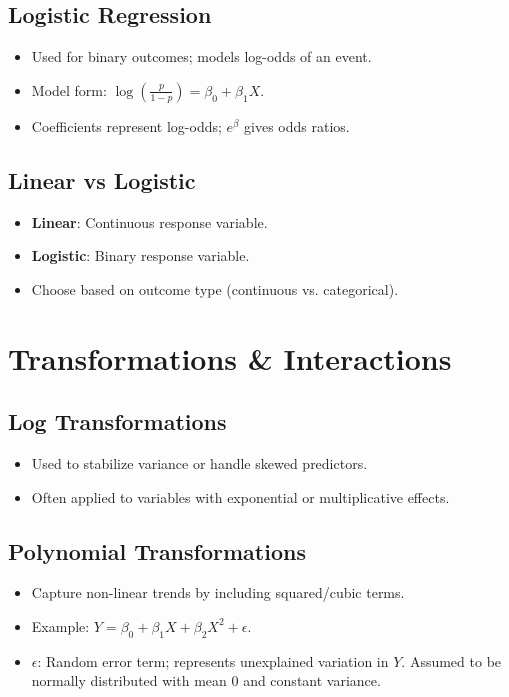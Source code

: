 \documentclass[10pt, landscape]{article}
\begin{document}
\begin{multicols}{3}
\subsection{Logistic Regression}
\begin{itemize}[noitemsep]
    \item Used for binary outcomes; models log-odds of an event.
    \item Model form: \( \log\left(\frac{p}{1-p}\right) = \beta_0 + \beta_1 X \).
    \item Coefficients represent log-odds; \(e^{\beta}\) gives odds ratios.
\end{itemize}

\subsection{Linear vs Logistic}
\begin{itemize}[noitemsep]
    \item \textbf{Linear}: Continuous response variable.
    \item \textbf{Logistic}: Binary response variable.
    \item Choose based on outcome type (continuous vs. categorical).
\end{itemize}

\section{Transformations \& Interactions}

\subsection{Log Transformations}
\begin{itemize}[noitemsep]
    \item Used to stabilize variance or handle skewed predictors.
    \item Often applied to variables with exponential or multiplicative effects.
\end{itemize}

\subsection{Polynomial Transformations}
\begin{itemize}[noitemsep]
    \item Capture non-linear trends by including squared/cubic terms.
    \item Example: \( Y = \beta_0 + \beta_1X + \beta_2X^2 + \epsilon \).
    \item \(\epsilon\): Random error term; represents unexplained variation in \(Y\). Assumed to be normally distributed with mean 0 and constant variance.
\end{itemize}


\end{multicols}
\end{document}
